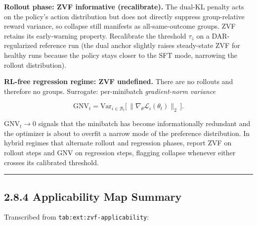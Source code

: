\documentclass[
  american,
  11pt,
  a4paper,
  oneside]{report}
\begin{document}
\textbf{Rollout phase: ZVF informative (recalibrate).} The dual-KL
penalty acts on the policy's action distribution but does not directly
suppress group-relative reward variance, so collapse still manifests as
all-same-outcome groups. ZVF retains its early-warning property.
Recalibrate the threshold \(\tau_z\) on a DAR-regularized reference run
(the dual anchor slightly raises steady-state ZVF for healthy runs
because the policy stays closer to the SFT mode, narrowing the rollout
distribution).

\textbf{RL-free regression regime: ZVF undefined.} There are no rollouts
and therefore no groups. Surrogate: per-minibatch \emph{gradient-norm
variance}

\[\mathrm{GNV}_t = \mathrm{Var}_{i \in \mathcal{B}_t}\bigl[\,\lVert \nabla_\theta \mathcal{L}_i(\theta_t) \rVert_2\,\bigr].\]

\(\mathrm{GNV}_t \to 0\) signals that the minibatch has become
informationally redundant and the optimizer is about to overfit a narrow
mode of the preference distribution. In hybrid regimes that alternate
rollout and regression phases, report ZVF on rollout steps and
\(\mathrm{GNV}\) on regression steps, flagging collapse whenever either
crosses its calibrated threshold.

\begin{center}\rule{0.5\linewidth}{0.5pt}\end{center}

\subsection{2.8.4 Applicability Map
Summary}\label{applicability-map-summary}

Transcribed from \texttt{tab:ext:zvf-applicability}:
\end{document}
